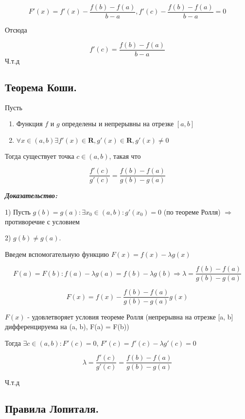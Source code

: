 \documentclass[a4paper,12pt]{article}
\theoremstyle{plain} %
\theoremstyle{definition} %
\theoremstyle{remark} %
\begin{document}
\[ F'(x) = f'(x) - \frac{f(b) - f(a)}{b - a}, f'(c) - \frac{f(b) - f(a)}{b - a} = 0\]

Отсюда

\[ f'(c) = \frac{f(b) - f(a)}{b - a} \]
Ч.т.д



\newpage
\subsection*{Теорема Коши.                                                                              }
Пусть
\begin{enumerate}
	\item Функция $f$ и $g$ определены и непрерывны на отрезке $[a, b]$
	\item $\forall x \in (a, b) \exists f'(x) \in \mathbf{R}, g'(x) \in \mathbf{R}, g'(x) \neq 0 $
\end{enumerate}

Тогда существует точка $c \in (a, b)$, такая что

\[
	\frac{f'(c)}{g'(c)} = \frac{f(b) - f(a)}{g(b) - g(a)}
\]

\textit{\textbf{Доказательство:}}

1) Пусть $g(b) = g(a): \exists x_0 \in (a, b): g'(x_0) = 0$ (по теореме Ролля) $\Rightarrow$ противоречие с условием

2) $g(b) \neq g(a)$.

Введем вспомогательную функцию $F(x) = f(x) - \lambda g(x)$

\[
	F(a) = F(b): f(a) - \lambda g(a) = f(b) - \lambda g(b) \Rightarrow \lambda  = \frac{f(b) - f(a)}{g(b) - g(a)}
\]

\[
	F(x) = f(x) - \frac{f(b) - f(a)}{g(b) - g(a)}g(x)
\]

$F(x)$ - удовлетворяет условия теореме Ролля (непрерывна на отрезке [a, b] дифференцируема на (a, b), F(a) = F(b))

Тогда $\exists c \in (a, b): F'(c) = 0$, $F'(c) = f'(c) - \lambda g'(c) = 0$

\[
	\lambda = \frac{f'(c)}{g'(c)} = \frac{f(b) - f(a)}{g(b) - g(a)}
\]

Ч.т.д


\newpage
\subsection*{Правила Лопиталя.                                                                          }
\end{document}
